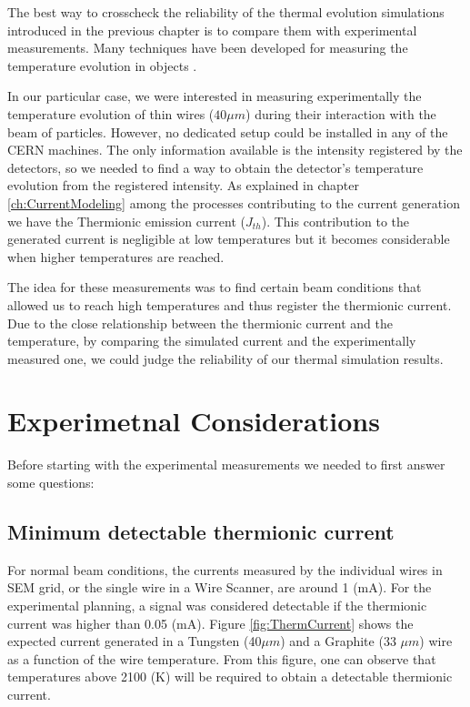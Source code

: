 \pagestyle{fancy}

\graphicspath{ {Figures/Chapter5_SimulationBenchmarking/} }

The best way to crosscheck the reliability of the thermal evolution simulations introduced in the previous chapter is to compare them with experimental measurements. Many techniques have been developed for measuring the temperature evolution in objects \parencite[][]{ref:ThMeas1}. 

In our particular case, we were interested in measuring experimentally the temperature evolution of thin wires ($40 \mu m$) during their interaction with the beam of particles. However, no dedicated setup could be installed in any of the CERN machines. The only information available is the intensity registered by the detectors, so we needed to find a way to obtain the detector's temperature evolution from the registered intensity.  As explained in chapter \ref{ch:CurrentModeling} among the processes contributing to the current generation we have the Thermionic emission current ($J_{th}$). This contribution to the generated current is negligible at low temperatures but it becomes considerable when higher temperatures are reached. 

The idea for these measurements was to find certain beam conditions that allowed us to reach high temperatures and thus register the thermionic current. Due to the close relationship between the thermionic current and the temperature, by comparing the simulated current and the experimentally measured one, we could judge the reliability of our thermal simulation results. 

\section{Experimetnal Considerations}

Before starting with the experimental measurements we needed to first answer some questions: 

\subsection{Minimum detectable thermionic current}

For normal beam conditions, the currents measured by the individual wires in SEM grid, or the single wire in a Wire Scanner, are around 1 (mA). For the experimental planning, a signal was considered detectable if the thermionic current was higher than 0.05 (mA). Figure \ref{fig:ThermCurrent} shows the expected current generated in a Tungsten (40$\mu m$) and a Graphite (33 $\mu m$) wire as a function of the wire temperature. From this figure, one can observe that temperatures above 2100 (K) will be required to obtain a detectable thermionic current.  

